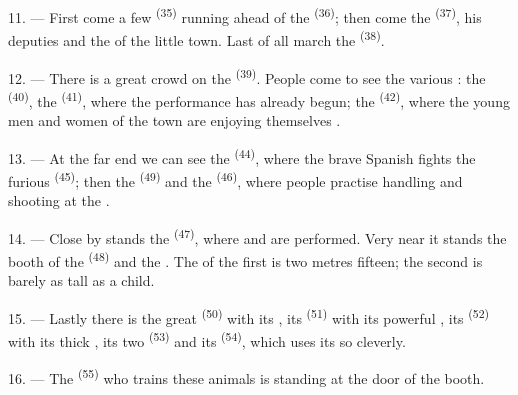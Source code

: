 11. --- First come a few  \textsuperscript{(35)} running ahead of the
 \textsuperscript{(36)}; then come the  \textsuperscript{(37)}, his
deputies and the  of the little town. Last of all march the
 \textsuperscript{(38)}.

\VUsaut{5.0mm}
\VUsaut{3.6mm}

12. --- There is a great crowd on the  \textsuperscript{(39)}. People come
to see the various : the  \textsuperscript{(40)}, the
 \textsuperscript{(41)}, where the performance has already begun; the
 \textsuperscript{(42)}, where the young men and women of the town are
enjoying themselves .

13. --- At the far end we can see the  \textsuperscript{(44)}, where the brave
Spanish  fights the furious  \textsuperscript{(45)}; then the
 \textsuperscript{(49)} and the
 \textsuperscript{(46)}, where people practise handling
 and shooting at the .

14. --- Close by stands the  \textsuperscript{(47)}, where
 and  are performed. Very near it stands the booth of the
 \textsuperscript{(48)} and the . The
 of the first is two metres fifteen; the second is barely as
tall as a child.

15. --- Lastly there is the great  \textsuperscript{(50)} with its
, its  \textsuperscript{(51)} with its powerful
, its  \textsuperscript{(52)} with its thick ,
its two  \textsuperscript{(53)} and its 
\textsuperscript{(54)}, which uses its  so cleverly.

16. --- The  \textsuperscript{(55)} who trains these animals is standing at the
door of the booth.
\VUsaut{6.0mm}
\VUfilet{22mm}
